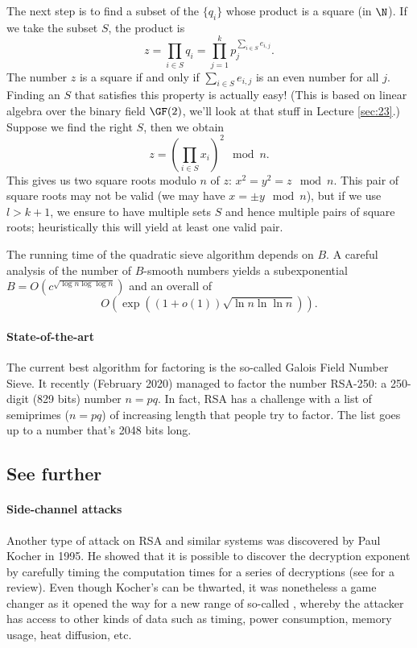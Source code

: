 \documentclass[a4paper, 11pt, openany]{book}
\begin{document}
The next step is to find a subset of the $\{q_i\}$ whose product is a square (in $\N$). If we take the subset $S$, the product is
\[
    z = \prod_{i \in S} q_i = \prod_{j=1}^k p_j^{\sum_{i \in S} e_{i,j}}.
\]
The number $z$ is a square if and only if $\sum_{i \in S} e_{i,j}$ is an even number for all $j$. Finding an $S$ that satisfies this property is actually easy! (This is based on linear algebra over the binary field $\GF(2)$, we'll look at that stuff in Lecture \ref{sec:23}.) Suppose we find the right $S$, then we obtain
\[
    z = \left( \prod_{i \in S} x_i  \right)^2 \mod n.
\]
This gives us two square roots modulo $n$ of $z$: $x^2 = y^2 = z \mod n$. This pair of square roots may not be valid (we may have $x = \pm y \mod n$), but if we use $l > k+1$, we ensure to have multiple sets $S$ and hence multiple pairs of square roots; heuristically this will yield at least one valid pair.

The running time of the quadratic sieve algorithm depends on $B$. A careful analysis of the number of $B$-smooth numbers yields a subexponential $B = O(c^{\sqrt{\log n \log \log n}})$ and an overall  of
\[
    O\left( \exp( (1 + o(1)) \sqrt{ \ln n \ln \ln n } ) \right).
\]

\paragraph{State-of-the-art}
The current best algorithm for factoring is the so-called Galois Field Number Sieve. It recently (February 2020) managed to factor the number RSA-250: a 250-digit (829 bits) number $n=pq$. In fact, RSA has a challenge with a list of semiprimes ($n= pq$) of increasing length that people try to factor. The list goes up to a number that's 2048 bits long.


\subsection{See further}

\paragraph{Side-channel attacks}
Another type of attack on RSA and similar systems was discovered by Paul Kocher in 1995. He showed that it is possible to discover the decryption exponent by carefully timing the computation times for a series of decryptions (see \cite[Section 6.2]{TW02} for a review). Even though Kocher's  can be thwarted, it was nonetheless a game changer as it opened the way for a new range of so-called , whereby the attacker has access to other kinds of data such as timing, power consumption, memory usage, heat diffusion, etc.
\end{document}
